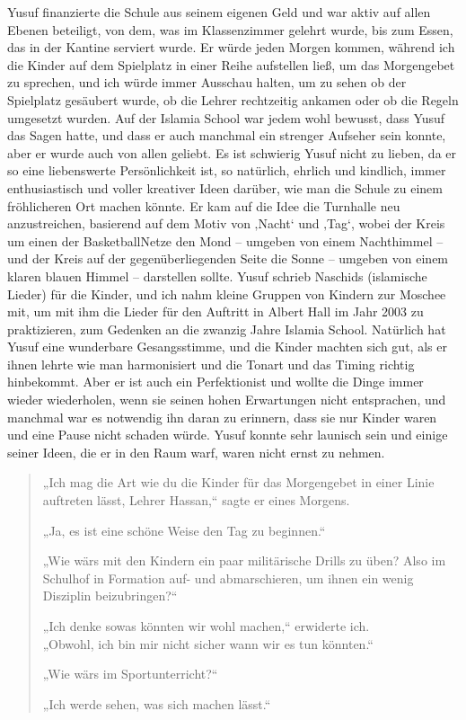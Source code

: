 \documentclass[12pt]{memoir}
\begin{document}
Yusuf finanzierte die Schule aus seinem eigenen Geld
und war aktiv auf allen Ebenen beteiligt,
von dem, was im Klassenzimmer gelehrt wurde, bis zum Essen,
das in der Kantine serviert wurde.
Er würde jeden Morgen kommen, während ich die Kinder
auf dem Spielplatz in einer Reihe aufstellen ließ,
um das Morgengebet zu sprechen,
und ich würde immer Ausschau halten,
um zu sehen ob der Spielplatz gesäubert wurde,
ob die Lehrer rechtzeitig ankamen oder ob die Regeln umgesetzt wurden.
Auf der Islamia School war jedem wohl bewusst, dass Yusuf das Sagen hatte,
und dass er auch manchmal ein strenger Aufseher sein konnte,
aber er wurde auch von allen geliebt.
Es ist schwierig Yusuf nicht zu lieben,
da er so eine liebenswerte Persönlichkeit ist,
so natürlich, ehrlich und kindlich,
immer enthusiastisch und voller kreativer Ideen darüber,
wie man die Schule zu einem fröhlicheren Ort machen könnte.
Er kam auf die Idee die Turnhalle neu anzustreichen,
basierend auf dem Motiv von ‚Nacht‘ und ‚Tag‘,
wobei der Kreis um einen der Basketball\–Netze
den Mond – umgeben von einem Nachthimmel –
und der Kreis auf der gegenüberliegenden Seite
die Sonne – umgeben von einem klaren blauen Himmel – darstellen sollte.
Yusuf schrieb Naschids (islamische Lieder) für die Kinder,
und ich nahm kleine Gruppen von Kindern zur Moschee mit,
um mit ihm die Lieder für den Auftritt
in Albert Hall im Jahr 2003 zu praktizieren,
zum Gedenken an die zwanzig Jahre Islamia School.
Natürlich hat Yusuf eine wunderbare Gesangsstimme,
und die Kinder machten sich gut,
als er ihnen lehrte wie man harmonisiert und
die Tonart und das Timing richtig hinbekommt.
Aber er ist auch ein Perfektionist und wollte
die Dinge immer wieder wiederholen,
wenn sie seinen hohen Erwartungen nicht entsprachen,
und manchmal war es notwendig ihn daran zu erinnern,
dass sie nur Kinder waren und eine Pause nicht schaden würde.
Yusuf konnte sehr launisch sein und einige seiner Ideen,
die er in den Raum warf, waren nicht ernst zu nehmen.

\begin{quote}
„Ich mag die Art wie du die Kinder für das Morgengebet
in einer Linie auftreten lässt, Lehrer Hassan,“ sagte er eines Morgens.

„Ja, es ist eine schöne Weise den Tag zu beginnen.“

„Wie wärs mit den Kindern ein paar militärische Drills zu üben?
Also im Schulhof in Formation  auf- und abmarschieren,
um ihnen ein wenig Disziplin beizubringen?“

„Ich denke sowas könnten wir wohl machen,“ erwiderte ich.\\
„Obwohl, ich bin mir nicht sicher wann wir es tun könnten.“

„Wie wärs im Sportunterricht?“

„Ich werde sehen, was sich machen lässt.“
\end{quote}
\end{document}
